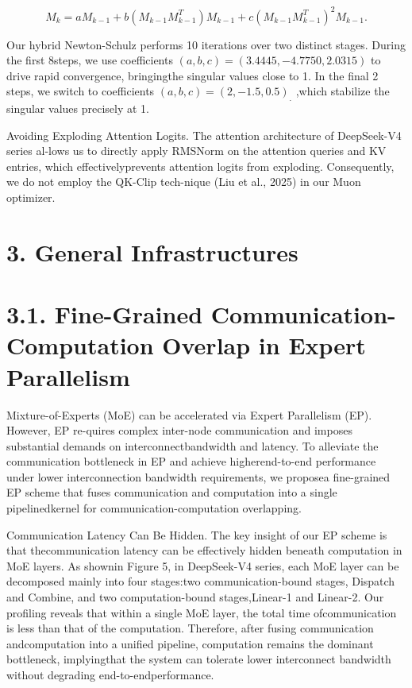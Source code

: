 \documentclass[
  10
]{article}
\begin{document}
\[
M _ {k} = a M _ {k - 1} + b \left(M _ {k - 1} M _ {k - 1} ^ {T}\right) M _ {k - 1} + c \left(M _ {k - 1} M _ {k - 1} ^ {T}\right) ^ {2} M _ {k - 1}. \tag {28}
\]

Our hybrid Newton-Schulz performs 10 iterations over two distinct
stages. During the first 8steps, we use coefficients
\(( a , b , c ) = ( 3 . 4 4 4 5 , - 4 . 7 7 5 0 , 2 . 0 3 1 5 )\) to
drive rapid convergence, bringingthe singular values close to 1. In the
final 2 steps, we switch to coefficients
\(( a , b , c ) = ( 2 , - 1 . 5 , 0 . 5 ) _ { . }\) ,which stabilize the
singular values precisely at 1.

Avoiding Exploding Attention Logits. The attention architecture of
DeepSeek-V4 series al-lows us to directly apply RMSNorm on the attention
queries and KV entries, which effectivelyprevents attention logits from
exploding. Consequently, we do not employ the QK-Clip tech-nique (Liu et
al., 2025) in our Muon optimizer.

\section{3. General Infrastructures}\label{general-infrastructures}

\section{3.1. Fine-Grained Communication-Computation Overlap in Expert
Parallelism}\label{fine-grained-communication-computation-overlap-in-expert-parallelism}

Mixture-of-Experts (MoE) can be accelerated via Expert Parallelism (EP).
However, EP re-quires complex inter-node communication and imposes
substantial demands on interconnectbandwidth and latency. To alleviate
the communication bottleneck in EP and achieve higherend-to-end
performance under lower interconnection bandwidth requirements, we
proposea fine-grained EP scheme that fuses communication and computation
into a single pipelinedkernel for communication-computation overlapping.

Communication Latency Can Be Hidden. The key insight of our EP scheme is
that thecommunication latency can be effectively hidden beneath
computation in MoE layers. As shownin Figure 5, in DeepSeek-V4 series,
each MoE layer can be decomposed mainly into four stages:two
communication-bound stages, Dispatch and Combine, and two
computation-bound stages,Linear-1 and Linear-2. Our profiling reveals
that within a single MoE layer, the total time ofcommunication is less
than that of the computation. Therefore, after fusing communication
andcomputation into a unified pipeline, computation remains the dominant
bottleneck, implyingthat the system can tolerate lower interconnect
bandwidth without degrading end-to-endperformance.
\end{document}
